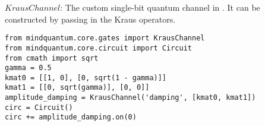 $Kraus Channel$: The custom single-bit quantum channel in \MindQuantum. It can be constructed by passing in the Kraus operators.
\begin{lstlisting}
from mindquantum.core.gates import KrausChannel
from mindquantum.core.circuit import Circuit
from cmath import sqrt
gamma = 0.5
kmat0 = [[1, 0], [0, sqrt(1 - gamma)]]
kmat1 = [[0, sqrt(gamma)], [0, 0]]
amplitude_damping = KrausChannel('damping', [kmat0, kmat1])
circ = Circuit()
circ += amplitude_damping.on(0)
\end{lstlisting}